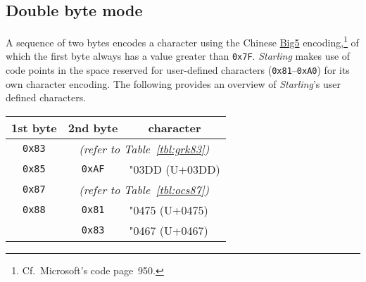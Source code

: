 \documentclass[12pt]{article}
\newcommand{\tblref}[1]{Table~\ref{#1}}
\newcommand{\thead}[1]{\multicolumn{1}{c}{\textbf{#1}}}
\newcommand{\Starling}{\emph{Starling}}
\newcommand{\byte}[1]{\texttt{#1}}
\newcommand{\Greek}{\Galatia}
\newcommand{\OCS}{\DejaVuSans}
\begin{document}
\subsection{Double byte mode}
A sequence of two bytes encodes a character using the Chinese \href{http://en.wikipedia.org/wiki/Big5}{Big5} encoding,\footnote{Cf.~Microsoft's code page~950.} of which the first byte always has a value greater than \byte{0x7F}. \Starling{} makes use of code points in the space reserved for user-defined characters (\byte{0x81}--\byte{0xA0}) for its own character encoding. The following provides an overview of \Starling{}'s user defined characters.\\
\begin{center}
\begin{tabular}{ccl}
	\toprule
	\thead{1st byte} & \thead{2nd byte} & \thead{character}\\
	\midrule
	\byte{0x83} & \multicolumn{2}{c}{\itshape(refer to \tblref{tbl:grk83})}\\
	\midrule
	\byte{0x85} & \byte{0xAF} & {\Greek\char"03DD} (U+03DD)\\
	\midrule
	\byte{0x87} & \multicolumn{2}{c}{\itshape(refer to \tblref{tbl:ocs87})}\\
	\midrule
	\byte{0x88} & \byte{0x81} & {\OCS\char"0475} (U+0475)\\
			  & \byte{0x83} & {\OCS\char"0467} (U+0467)\\
	\bottomrule
\end{tabular}
\end{center}
\end{document}
